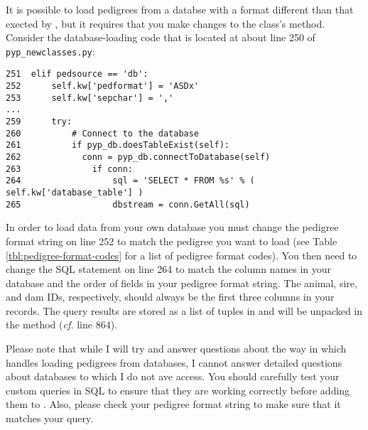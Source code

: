 It is possible to load pedigrees from a databse with a format different than that exected by \PyPedal{}, but it requires that you make changes to the  class's  method. Consider the database-loading code that is located at about line 250 of \texttt{pyp_newclasses.py}:
\begin{verbatim}
251  elif pedsource == 'db':
252      self.kw['pedformat'] = 'ASDx'
253      self.kw['sepchar'] = ','
...
259      try:
260          # Connect to the database
261          if pyp_db.doesTableExist(self):
262            conn = pyp_db.connectToDatabase(self)
263              if conn:
264                  sql = 'SELECT * FROM %s' % ( self.kw['database_table'] )
265                  dbstream = conn.GetAll(sql)
\end{verbatim}
In order to load data from your own database you must change the pedigree format string
on line 252 to match the pedigree you want to load (see Table
\ref{tbl:pedigree-format-codes} for a list of pedigree format codes). You then need to
change the SQL statement on line 264 to match the column names in your database and the
order of fields in your pedigree format string. The animal, sire, and dam IDs,
respectively, should always  be the first three columns in your records. The query
results are stored as a list of tuples in  and will be unpacked in the
 method (\textit{cf.} line 864).

Please note that while I will try and answer questions about the way in which \PyPedal{}
handles loading pedigrees from databases, I cannot answer detailed questions about 
databases to which I do not ave access. You should carefully test your custom queries in
SQL to ensure that they are working correctly before adding them to \PyPedal{}. Also,
please check your pedigree format string to make sure that it matches your query.

